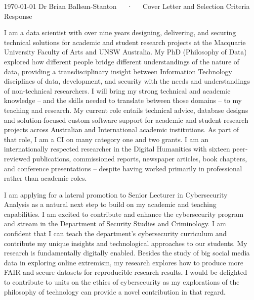 \documentclass[11pt, a4paper]{awesome-cv}
\begin{document}
\makecvheader[C]

\makecvfooter
 {\today}
 {Dr Brian Ballsun-Stanton~~~·~~~Cover Letter and Selection Criteria Response}
 {\thepage}

\makelettertitle

\begin{cvletter}


I am a data scientist with over nine years designing, delivering, and securing technical solutions for academic and student research projects at the Macquarie University Faculty of Arts and UNSW Australia. My PhD (Philosophy of Data) explored how different people bridge different understandings of the nature of data, providing a transdisciplinary insight between Information Technology disciplines of data, development, and security with the needs and understandings of non-technical researchers. I will bring my strong technical and academic knowledge -- and the skills needed to translate between those domains -- to my teaching and research. My current role entails technical advice, database designs and solution-focused custom software support for academic and student research projects across Australian and International academic institutions. As part of that role, I am a CI on many category one and two grants. I am an internationally respected researcher in the Digital Humanities with sixteen peer-reviewed publications, commissioned reports, newspaper articles, book chapters, and conference presentations -- despite having worked primarily in professional rather than academic roles.

I am applying for a lateral promotion to Senior Lecturer in Cybersecurity Analysis as a natural next step to build on my academic and teaching capabilities. I am excited to contribute and enhance the cybersecurity program and stream in the Department of Security Studies and Criminology. I am confident that I can teach the department's cybersecurity curriculum and contribute my unique insights and technological approaches to our students. My research is fundamentally digitally enabled. Besides the study of big social media data in exploring online extremism, my research explores how to produce more FAIR and secure datasets for reproducible research results. I would be delighted to contribute to units on the ethics of cybersecurity as my explorations of the philosophy of technology can provide a novel contribution in that regard.


\end{cvletter}
\end{document}
